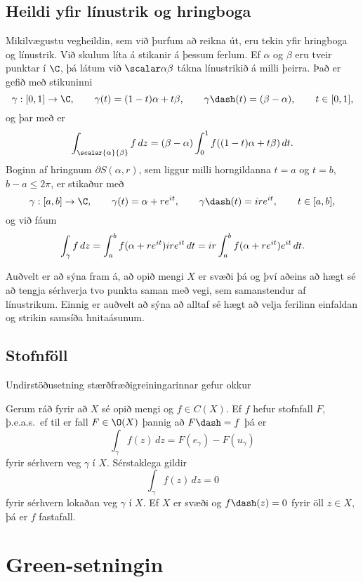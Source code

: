 \subsection*{Heildi yfir línustrik og hringboga }

Mikilvægustu vegheildin, sem við þurfum að reikna út, eru tekin yfir
hringboga og línustrik.  Við skulum
líta á stikanir á þessum ferlum.  Ef $\alpha$ og $\beta$ eru tveir punktar í
$\C$, þá látum við $\scalar \alpha \beta$ tákna línustrikið á milli
þeirra.  Það er gefið með stikuninni
 $$
\gamma:[0,1]\to \C, \qquad \gamma(t)=(1-t)\alpha+t\beta, \qquad
\gamma\dash(t)= (\beta-\alpha), \qquad t\in [0,1],
 $$
og þar með er 
 $$\int_{\scalar{\alpha}{\beta}} f \, dz = (\beta-\alpha)\int_0\sp 1
f((1-t)\alpha+t\beta)\, dt.
 $$
Boginn af hringnum $\partial S(\alpha,r)$, sem liggur milli
horngildanna $t=a$ og $t=b$, $b-a\leq 2{\pi}$, er stikaður með
 $$\gamma:[a,b]\to \C, \qquad
\gamma(t)= \alpha+re\sp{it}, \qquad
\gamma\dash(t)= ire\sp{it}, \qquad t\in [a,b],
 $$
og við fáum 
 $$
\int_\gamma f \, dz = \int_a\sp b f(\alpha+re\sp{it})ire\sp{it}\, dt
= ir \int_a\sp b f(\alpha+re\sp{it})e\sp{it}\, dt.
 $$


Auðvelt er að sýna fram á, að opið mengi $X$ er svæði þá og því aðeins að
hægt sé að tengja sérhverja tvo punkta saman með vegi, sem samanstendur
af línustrikum. Einnig er auðvelt að sýna að alltaf sé hægt að velja ferilinn
einfaldan og strikin samsíða hnitaásunum. 

\subsection*{Stofnföll}

Undirstöðusetning stærðfræðigreiningarinnar gefur okkur

\begin{se} \label{se:10.1.3} Gerum ráð fyrir að $X$ sé opið mengi og $f\in C(X)$. Ef $f$ hefur
stofnfall $F$, þ.e.a.s.~ef til er fall $F\in \O(X)$
þannig að
$F\dash=f$ þá er
 $$\int_\gamma f(z)\, dz = F(e_\gamma)-F(u_\gamma)
 $$
fyrir sérhvern veg $\gamma$ í $X$.  Sérstaklega gildir
 $$\int_\gamma f(z)\, dz = 0
 $$
fyrir sérhvern lokaðan veg $\gamma$ í $X$.  Ef $X$ er svæði og 
$f\dash(z)=0$ fyrir öll $z\in X$, þá er $f$ fastafall.
\end{se}


\section{Green-setningin}

